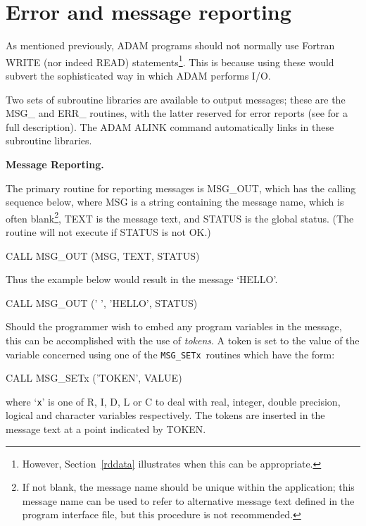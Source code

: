 \documentclass[twoside,11pt,nolof]{starlink}
\begin{document}
\newpage
\section{Error and message reporting\label{repdim1}}

As mentioned previously, ADAM programs should not
normally use Fortran WRITE (nor indeed READ)
statements\footnote{However, Section~\ref{rddata} illustrates when this can be
appropriate.}.
This is because using these would subvert the sophisticated way
in which ADAM performs I/O.

Two sets of subroutine libraries are available to output
messages; these are the MSG\_  and ERR\_ routines, with the latter
reserved for error reports
(see  for a full description).
The ADAM ALINK command automatically links in these subroutine libraries.

{\bigskip\large\bf Message Reporting.}

The primary routine for reporting messages is MSG\_OUT, which has the
calling sequence below, where MSG is a string containing the message
name, which is often blank\footnote{If not blank, the message name should
be unique within the application;
this message name can be used to refer to alternative message text defined
in the program interface file, but this procedure is
not recommended.},
TEXT is the message text, and STATUS is the global status.
(The routine will not execute if STATUS is not OK.)
\begin{terminalv}
      CALL MSG_OUT (MSG, TEXT, STATUS)
\end{terminalv}
Thus the example below would result in the message `HELLO'.
\begin{terminalv}
      CALL MSG_OUT (' ', 'HELLO', STATUS)
\end{terminalv}
Should the programmer wish to embed any program variables in
the message, this can be accomplished with the use of  {\sl tokens}.
A token is set to the value of the variable concerned
using one of the \texttt{MSG\_SETx}\  routines which have the form:
\begin{terminalv}
      CALL MSG_SETx ('TOKEN', VALUE)
\end{terminalv}
where `\texttt{x}' is one of R, I, D, L or
C to deal with real, integer, double precision, logical and
character variables respectively.
The tokens are inserted in the message text
at a point indicated by \wedge TOKEN.
\end{document}
